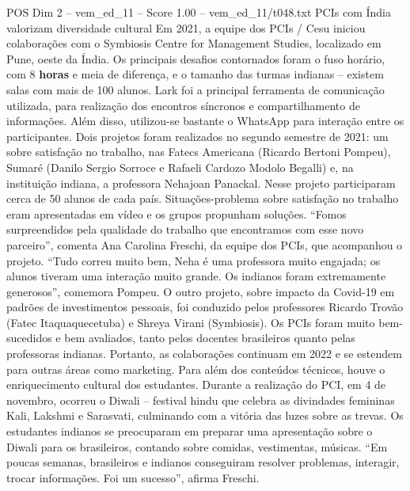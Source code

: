 \begin{textsample}{POS Dim 2 – vem\_ed\_11 – Score 1.00 – vem\_ed\_11/t048.txt}  \label{ex:f2_pos_027}
PCIs com Índia valorizam diversidade cultural Em 2021, a equipe dos PCIs / Cesu iniciou colaborações com o Symbiosis Centre for Management Studies, localizado em Pune, oeste da Índia.
Os principais desafios contornados foram o fuso horário, com 8 \textbf{horas} e meia de diferença, e o tamanho das turmas indianas – existem salas com mais de 100 alunos.
Lark foi a principal ferramenta de comunicação utilizada, para realização dos encontros síncronos e compartilhamento de informações.
Além disso, utilizou-se bastante o WhatsApp para interação entre os participantes.
Dois projetos foram realizados no segundo semestre de 2021: um sobre satisfação no trabalho, nas Fatecs Americana (Ricardo Bertoni Pompeu), Sumaré (Danilo Sergio Sorroce e Rafaeli Cardozo Modolo Begalli) e, na instituição indiana, a professora Nehajoan Panackal.
Nesse projeto participaram cerca de 50 alunos de cada país.
Situações-problema sobre satisfação no trabalho eram apresentadas em vídeo e os grupos propunham soluções. “Fomos surpreendidos pela qualidade do trabalho que encontramos com esse novo parceiro”, comenta Ana Carolina Freschi, da equipe dos PCIs, que acompanhou o projeto. “Tudo correu muito bem, Neha é uma professora muito engajada; os alunos tiveram uma interação muito grande.
Os indianos foram extremamente generosos”, comemora Pompeu.
O outro projeto, sobre impacto da Covid-19 em padrões de investimentos pessoais, foi conduzido pelos professores Ricardo Trovão (Fatec Itaquaquecetuba) e Shreya Virani (Symbiosis).
Os PCIs foram muito bem-sucedidos e bem avaliados, tanto pelos docentes brasileiros quanto pelas professoras indianas.
Portanto, as colaborações continuam em 2022 e se estendem para outras áreas como marketing.
Para além dos conteúdos técnicos, houve o enriquecimento cultural dos estudantes.
Durante a realização do PCI, em 4 de novembro, ocorreu o Diwali – festival hindu que celebra as divindades femininas Kali, Lakshmi e Sarasvati, culminando com a vitória das luzes sobre as trevas.
Os estudantes indianos se preocuparam em preparar uma apresentação sobre o Diwali para os brasileiros, contando sobre comidas, vestimentas, músicas. “Em poucas semanas, brasileiros e indianos conseguiram resolver problemas, interagir, trocar informações.
Foi um sucesso”, afirma Freschi.

\end{textsample}
